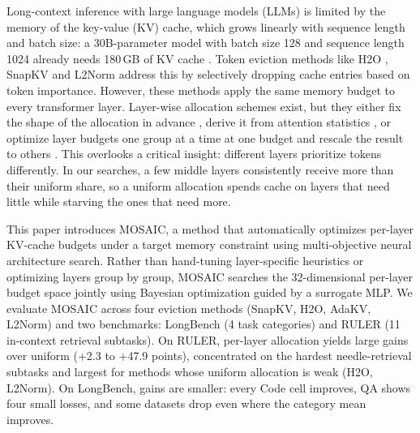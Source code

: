 \documentclass[11pt]{article}
\begin{document}
Long-context inference with large language models (LLMs) is limited by the memory of the key-value (KV) cache, which grows linearly with sequence length and batch size: a 30B-parameter model with batch size 128 and sequence length 1024 already needs 180\,GB of KV cache \citep{zhang2023h2o}. Token eviction methods like H2O \citep{zhang2023h2o}, SnapKV \citep{li2024snapkv} and L2Norm \citep{devoto2024l2norm} address this by selectively dropping cache entries based on token importance. However, these methods apply the same memory budget to every transformer layer. Layer-wise allocation schemes exist, but they either fix the shape of the allocation in advance \citep{cai2025pyramidkv}, derive it from attention statistics \citep{qin2025cake}, or optimize layer budgets one group at a time at one budget and rescale the result to others \citep{yu2025evolkv}. This overlooks a critical insight: different layers prioritize tokens differently. In our searches, a few middle layers consistently receive more than their uniform share, so a uniform allocation spends cache on layers that need little while starving the ones that need more.

This paper introduces MOSAIC, a method that automatically optimizes per-layer KV-cache budgets under a target memory constraint using multi-objective neural architecture search. Rather than hand-tuning layer-specific heuristics or optimizing layers group by group, MOSAIC searches the 32-dimensional per-layer budget space jointly using Bayesian optimization guided by a surrogate MLP. We evaluate MOSAIC across four eviction methods (SnapKV, H2O, AdaKV, L2Norm) and two benchmarks: LongBench (4 task categories) and RULER (11 in-context retrieval subtasks). On RULER, per-layer allocation yields large gains over uniform (+2.3 to +47.9 points), concentrated on the hardest needle-retrieval subtasks and largest for methods whose uniform allocation is weak (H2O, L2Norm). On LongBench, gains are smaller: every Code cell improves, QA shows four small losses, and some datasets drop even where the category mean improves.
\end{document}
